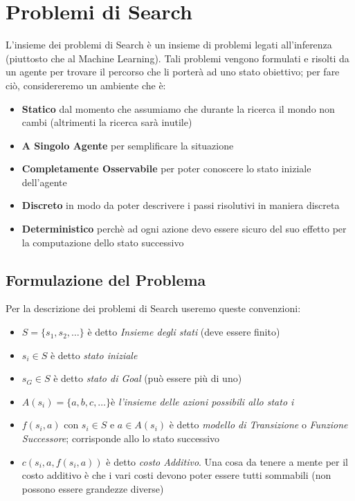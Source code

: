 \section{Problemi di Search}
L'insieme dei problemi di Search è un insieme di problemi legati all'inferenza (piuttosto che al Machine Learning). 
Tali problemi vengono formulati e risolti da un agente per trovare il percorso che li porterà ad uno stato obiettivo;
per fare ciò, considereremo un ambiente che è:
\begin{itemize}
    \item \textbf{Statico} dal momento che assumiamo che durante la ricerca il mondo non cambi (altrimenti la ricerca sarà inutile)
    \item \textbf{A Singolo Agente} per semplificare la situazione
    \item \textbf{Completamente Osservabile} per poter conoscere lo stato iniziale dell'agente
    \item \textbf{Discreto} in modo da poter descrivere i passi risolutivi in maniera discreta
    \item \textbf{Deterministico} perchè ad ogni azione devo essere sicuro del suo effetto per la computazione dello stato successivo
\end{itemize}
\subsection{Formulazione del Problema}
Per la descrizione dei problemi di Search useremo queste convenzioni:
\begin{itemize}
    \item $S = \{ s_1, s_2, \dots\}$ è detto \textit{Insieme degli stati} (deve essere finito)
    \item $s_i \in S$ è detto \textit{stato iniziale}
    \item $s_G \in S$ è detto \textit{stato di Goal} (può essere più di uno)
    \item $A(s_i) = \{ a,b,c,\dots\}$è \textit{l'insieme delle azioni possibili allo stato i}
    \item $f(s_i,a)$ con $s_i \in S$ e $a \in A(s_i)$ è detto \textit{modello di Transizione} o \textit{Funzione Successore}; corrisponde allo lo stato successivo
    \item $c(s_i,a,f(s_i,a))$ è detto \textit{costo Additivo}. Una cosa da tenere a mente per il costo additivo
    è che i vari costi devono poter essere tutti sommabili (non possono essere grandezze diverse)
\end{itemize}

